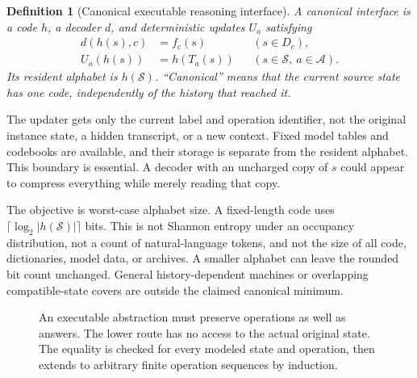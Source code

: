 \documentclass[11pt,letterpaper]{article}
\newcommand{\Sset}{\mathcal S}\newcommand{\Cset}{\mathcal C}
\newcommand{\Aset}{\mathcal A}\newcommand{\Zset}{\mathcal Z}
\newcommand{\bits}[1]{\lceil\log_2 #1\rceil}
\newtheorem{definition}{Definition}[section]
\theoremstyle{remark}\newtheorem{remark}{Remark}[section]
\begin{document}
\begin{definition}[Canonical executable reasoning interface]
A canonical interface is a code $h$, a decoder $d$, and deterministic updates $U_a$ satisfying
\begin{align}
 d(h(s),c)&=f_c(s) &&(s\in D_c),\\
 U_a(h(s))&=h(T_a(s)) &&(s\in\Sset,\ a\in\Aset).\label{eq:commute}
\end{align}
Its resident alphabet is $h(\Sset)$. ``Canonical'' means that the current source state has one code, independently of the history that reached it.
\end{definition}

The updater gets only the current label and operation identifier, not the original instance state, a hidden transcript, or a new context. Fixed model tables and codebooks are available, and their storage is separate from the resident alphabet. This boundary is essential. A decoder with an uncharged copy of $s$ could appear to compress everything while merely reading that copy.

The objective is worst-case alphabet size. A fixed-length code uses $\bits{|h(\Sset)|}$ bits. This is not Shannon entropy under an occupancy distribution, not a count of natural-language tokens, and not the size of all code, dictionaries, model data, or archives. A smaller alphabet can leave the rounded bit count unchanged. General history-dependent machines or overlapping compatible-state covers are outside the claimed canonical minimum.

\begin{figure}[htbp]\centering
{}
\caption{An executable abstraction must preserve operations as well as answers. The lower route has no access to the actual original state. The equality is checked for every modeled state and operation, then extends to arbitrary finite operation sequences by induction.}\label{fig:square}
\end{figure}
\end{document}
